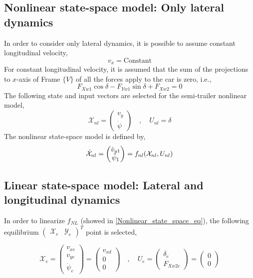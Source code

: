 \documentclass[12pt]{article}
\begin{document}
\subsection{Nonlinear state-space model: Only lateral dynamics }
In order to consider only lateral dynamics, it is possible to assume constant longitudinal velocity,
\begin{equation}
    v_x = \mathrm{Constant}
\end{equation}
For constant longitudinal velocity, it is assumed that the sum of the projections to $x$-axis of Frame $\{ V \}$ of all the forces apply to the car is zero, i.e.,
\begin{equation}
    F_{Xw1} \cos{\delta} - F_{Yw1} \sin{\delta} + F_{Xw2} = 0
\end{equation}
The following state and input vectors are selected for the semi-trailer nonlinear model,
\begin{equation}\label{NL_states_input_vx}
    \mathcal{X}_{nl} = \begin{pmatrix} v_{y} \\ \Dot{\psi} \end{pmatrix} \quad , \quad U_{nl} = \delta 
\end{equation}
The nonlinear state-space model is defined by,
\begin{equation} \label{Nonlinear_state_space_vx_eq}
    \Dot{\mathcal{X}}_{nl} = \begin{pmatrix} \Dot{v}_{y1} \\ \Ddot{\psi}_1 \end{pmatrix} = f_{nl}(\mathcal{X}_{nl},U_{nl})
\end{equation}

\subsection{Linear state-space model: Lateral and longitudinal dynamics}

In order to linearize $f_{NL}$ (showed in \eqref{Nonlinear_state_space_eq}), the following equilibrium $ \begin{pmatrix} \mathcal{X}_e & \mathcal{Y}_e\end{pmatrix}^T$ point is selected,

\begin{equation}
    \mathcal{X}_e = \begin{pmatrix} v_{xe} \\ v_{ye} \\ \Dot{\psi}_{e} \end{pmatrix} = \begin{pmatrix} v_{xd} \\ 0 \\ 0  \end{pmatrix} \quad , \quad U_e = \begin{pmatrix} \delta_{e} \\ F_{Xw2e} \end{pmatrix} = \begin{pmatrix} 0 \\ 0 \end{pmatrix}
\end{equation}
\end{document}
